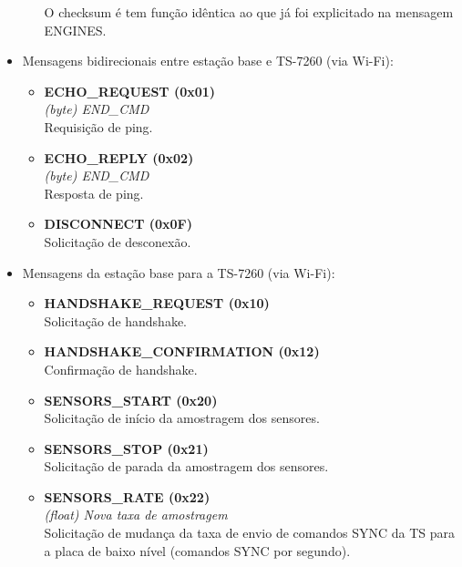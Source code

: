 \begin{itemize}
\begin{itemize}
	  O checksum é tem função idêntica ao que já foi explicitado na mensagem ENGINES.
	  
	  
	\end{itemize}

  \item Mensagens bidirecionais entre estação base e TS-7260 (via Wi-Fi):

    \begin{itemize}
      \item \textbf{ECHO\_REQUEST (0x01)}\\
      \textit{(byte) END\_CMD}\\
	Requisição de ping.
      \item \textbf{ECHO\_REPLY (0x02)}\\
      \textit{(byte) END\_CMD}\\
	Resposta de ping.
      \item \textbf{DISCONNECT (0x0F)} \\
	Solicitação de desconexão.
    \end{itemize}

  \item Mensagens da estação base para a TS-7260 (via Wi-Fi):

    \begin{itemize}
      \item \textbf{HANDSHAKE\_REQUEST (0x10)}\\
	Solicitação de handshake.

      \item \textbf{HANDSHAKE\_CONFIRMATION (0x12)}\\
	Confirmação de handshake.

      \item \textbf{SENSORS\_START (0x20)}\\
	Solicitação de início da amostragem dos sensores.

      \item \textbf{SENSORS\_STOP (0x21)}\\
	Solicitação de parada da amostragem dos sensores.

      \item \textbf{SENSORS\_RATE (0x22)} \\
	\textit{(float) Nova taxa de amostragem}\\
	Solicitação de mudança da taxa de envio de comandos SYNC da TS para a placa de baixo nível (comandos SYNC por segundo).



\end{itemize}
\end{itemize}

